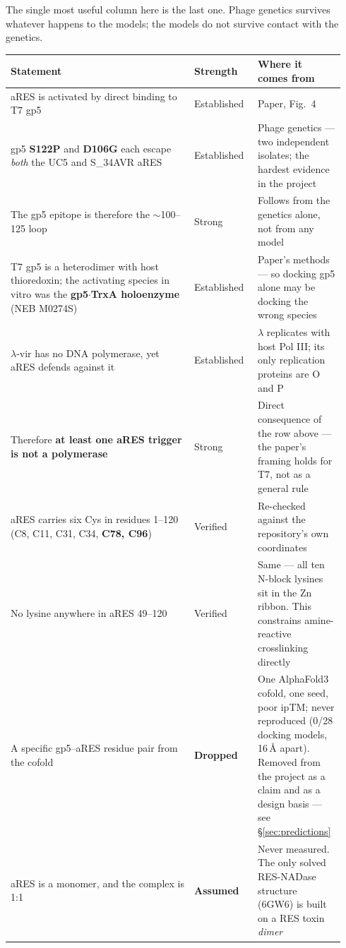 \documentclass[11pt,a4paper]{article}
\begin{document}
The single most useful column here is the last one. Phage genetics survives whatever happens to the
models; the models do not survive contact with the genetics.

\begin{longtable}{@{}p{0.52\linewidth}p{0.18\linewidth}p{0.24\linewidth}@{}}
\toprule
\textbf{Statement} & \textbf{Strength} & \textbf{Where it comes from}\\
\midrule
\endhead
aRES is activated by direct binding to T7 gp5 & Established & Paper, Fig.~4\\
gp5 \textbf{S122P} and \textbf{D106G} each escape \emph{both} the UC5 and S\_34AVR aRES &
  Established & Phage genetics --- two independent isolates; the hardest evidence in the project\\
The gp5 epitope is therefore the $\sim$100--125 loop & Strong & Follows from the genetics alone,
  not from any model\\
T7 gp5 is a heterodimer with host thioredoxin; the activating species in vitro was the
  \textbf{gp5$\cdot$TrxA holoenzyme} (NEB M0274S) & Established & Paper's methods --- so docking gp5
  alone may be docking the wrong species\\
$\lambda$-vir has no DNA polymerase, yet aRES defends against it & Established & $\lambda$ replicates
  with host Pol III; its only replication proteins are O and P\\
Therefore \textbf{at least one aRES trigger is not a polymerase} & Strong & Direct consequence of the
  row above --- the paper's framing holds for T7, not as a general rule\\
aRES carries six Cys in residues 1--120 (C8, C11, C31, C34, \textbf{C78, C96}) & Verified &
  Re-checked against the repository's own coordinates\\
No lysine anywhere in aRES 49--120 & Verified & Same --- all ten N-block lysines sit in the Zn ribbon.
  This constrains amine-reactive crosslinking directly\\
A specific gp5--aRES residue pair from the cofold & \textbf{Dropped} & One AlphaFold3 cofold, one
  seed, poor ipTM; never reproduced (0/28 docking models, 16\,\AA{} apart). Removed from the project
  as a claim and as a design basis --- see \S\ref{sec:predictions}\\
aRES is a monomer, and the complex is 1:1 & \textbf{Assumed} & Never measured. The only solved
  RES-NADase structure (6GW6) is built on a RES toxin \emph{dimer}\\
\bottomrule
\end{longtable}
\end{document}
